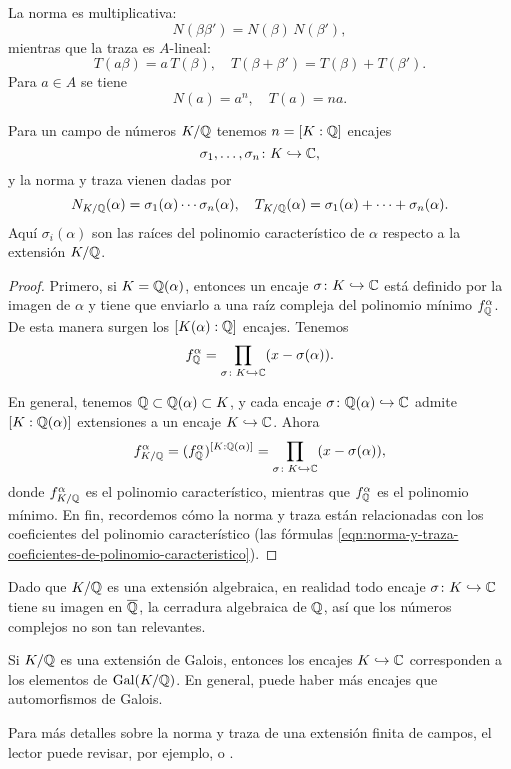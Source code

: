 La norma es multiplicativa:
$$N (\beta \beta') = N (\beta)\,N(\beta'),$$
mientras que la traza es $A$-lineal:
\[ T (a \beta) = a \, T (\beta), \quad
   T (\beta+\beta') = T (\beta) + T (\beta'). \]
Para $a \in A$ se tiene
$$N (a) = a^n, \quad T (a) = na.$$

\begin{proposicion}
  Para un campo de números $K/\mathbb{Q}$ tenemos $n = [K : \mathbb{Q}]$ encajes
  $$\sigma_1,\ldots,\sigma_n\colon K \hookrightarrow \mathbb{C},$$
  y la norma y traza vienen dadas por
  \[ N_{K/\mathbb{Q}} (\alpha) = \sigma_1 (\alpha) \cdots \sigma_n (\alpha), \quad
     T_{K/\mathbb{Q}} (\alpha) = \sigma_1 (\alpha) + \cdots + \sigma_n (\alpha). \]
  Aquí $\sigma_i (\alpha)$ son las raíces del polinomio característico
  de $\alpha$ respecto a la extensión $K/\mathbb{Q}$.

  \begin{proof}
    Primero, si $K = \mathbb{Q} (\alpha)$, entonces un encaje
    $\sigma\colon K \hookrightarrow \mathbb{C}$ está definido por la imagen de
    $\alpha$ y tiene que enviarlo a una raíz compleja del polinomio
    mínimo $f_{\mathbb{Q}}^\alpha$. De esta manera surgen los
    $[K (\alpha) : \mathbb{Q}]$ encajes. Tenemos
    \[ f_{\mathbb{Q}}^\alpha =
       \prod_{\sigma\colon K\hookrightarrow \mathbb{C}} (x - \sigma (\alpha)). \]

    En general, tenemos $\mathbb{Q} \subset \mathbb{Q} (\alpha) \subset K$, y cada
    encaje $\sigma\colon \mathbb{Q} (\alpha) \hookrightarrow \mathbb{C}$ admite
    $[K : \mathbb{Q} (\alpha)]$ extensiones a un encaje $K \hookrightarrow \mathbb{C}$.
    Ahora
    \[ f^\alpha_{K/\mathbb{Q}} = (f^\alpha_{\mathbb{Q}})^{[K : \mathbb{Q} (\alpha)]} =
       \prod_{\sigma\colon K\hookrightarrow \mathbb{C}} (x - \sigma (\alpha)), \]
    donde $f^\alpha_{K/\mathbb{Q}}$ es el polinomio característico, mientras que
    $f^\alpha_{\mathbb{Q}}$ es el polinomio mínimo.
    En fin, recordemos cómo la norma y traza están relacionadas con los
    coeficientes del polinomio característico (las fórmulas
    \eqref{eqn:norma-y-traza-coeficientes-de-polinomio-caracteristico}).
  \end{proof}
\end{proposicion}

\begin{comentario}
  Dado que $K/\mathbb{Q}$ es una extensión algebraica, en realidad todo encaje
  $\sigma\colon K \hookrightarrow \mathbb{C}$ tiene su imagen en $\overline{\mathbb{Q}}$,
  la cerradura algebraica de $\mathbb{Q}$, así que los números complejos no son
  tan relevantes.

  Si $K/\mathbb{Q}$ es una extensión de Galois, entonces los encajes
  $K \hookrightarrow \mathbb{C}$ corresponden a los elementos de $\operatorname{Gal} (K/\mathbb{Q})$.
  En general, puede haber más encajes que automorfismos de Galois.

  Para más detalles sobre la norma y traza de una extensión finita de campos,
  el lector puede revisar, por ejemplo, \cite[\S II.8]{Morandi-GTM167} o
  \cite[\S VI.5]{Lang-Algebra}.
\end{comentario}

